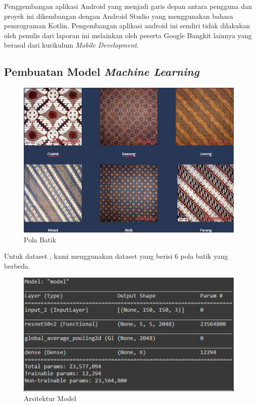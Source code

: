  Penggembangan aplikasi Android yang menjadi garis depan antara pengguna dan proyek ini dikembangan dengan Android Studio yang menggunakan bahasa pemrograman Kotlin.
  Pengembangan aplikasi android ini sendiri tidak dilakukan oleh penulis dari laporan ini melainkan oleh peserta Google Bangkit lainnya yang berasal dari kurikulum \textit{Mobile Development}.

  \subsection{Pembuatan Model \textit{Machine Learning}}
  
  \begin{figure}[htp!] \centering
    \includegraphics[scale=0.3]{gambar/batik.png}
    \caption{Pola Batik \cite{gultom2018batik}}
    \label{fig:polaBatik}
  \end{figure}
  
  Untuk dataset \cite{gultom2018batik}, kami menggunakan dataset yang berisi 6 pola batik yang berbeda.

  \begin{figure}[htp!] \centering
    \includegraphics[scale=0.5]{gambar/model.png}
    \caption{Arsitektur Model}
    \label{fig:model}
  \end{figure}
  
